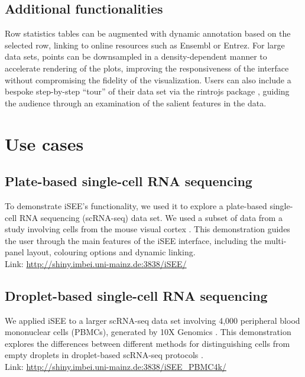 \documentclass[10pt,a4paper,twocolumn]{article}
\let\cite\citep
\begin{document}
\subsection*{Additional functionalities}
Row statistics tables can be augmented with dynamic annotation based on the selected row, linking to online resources such as Ensembl or Entrez. %
For large data sets, points can be downsampled in a density-dependent manner to accelerate rendering of the plots, improving the responsiveness of the interface without compromising the fidelity of the visualization.
Users can also include a bespoke step-by-step ``tour'' of their data set via the rintrojs package \cite{ganz2016rintrojs}, guiding the audience through an examination of the salient features in the data.

\section*{Use cases} %

\subsection*{Plate-based single-cell RNA sequencing}
To demonstrate iSEE's functionality, we used it to explore a plate-based single-cell RNA sequencing (scRNA-seq) data set.
We used a subset of data from a study involving cells from the mouse visual cortex \citep{tasic2016allen}.
This demonstration guides the user through the main features of the iSEE interface, including the multi-panel layout, colouring options and dynamic linking.\\

Link: \url{http://shiny.imbei.uni-mainz.de:3838/iSEE/}

\subsection*{Droplet-based single-cell RNA sequencing}
We applied iSEE to a larger scRNA-seq data set involving 4,000 peripheral blood mononuclear cells (PBMCs), generated by 10X Genomics \citep{zheng2017massively}.
This demonstration explores the differences between different methods for distinguishing cells from empty droplets in droplet-based scRNA-seq protocols \citep{lun2018distinguishing}.\\

Link: \url{http://shiny.imbei.uni-mainz.de:3838/iSEE_PBMC4k/}
\end{document}
